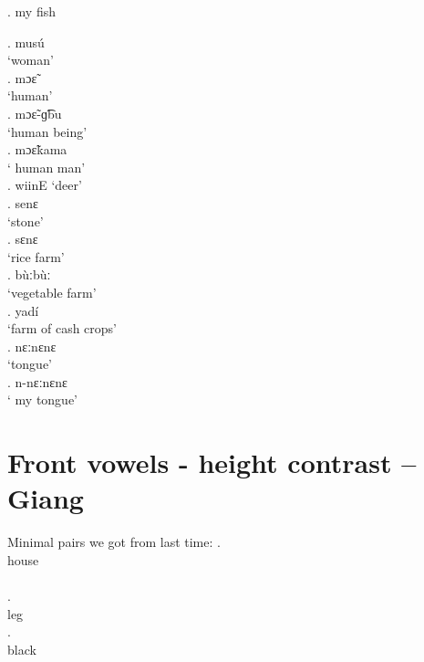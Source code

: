 \documentclass{assets/fieldnotes}
\begin{document}
\ex. my fish

\ex. musú\\
`woman'\\

\ex. mɔɛ̃ \\
`human'\\

\ex.  mɔɛ̃-ɡ͡bu \\
`human being'\\

\ex. mɔɛ̃kama\\
` human man'\\

\ex. wiinE
`deer'\\

\ex. senɛ\\
`stone'\\

\ex. sɛnɛ\\
`rice farm'\\

\ex. bùːbùː\\
`vegetable farm'\\

\ex. yadí\\
`farm of cash crops'\\

\ex. nɛːnɛnɛ\\
`tongue'\\

\exg. n-nɛːnɛnɛ\\
` my tongue'\\


\section{Front vowels - height contrast -- Giang}
Minimal pairs we got from last time:
\ex. \\
house\\
\\

\ex. \\
leg\\

\ex. \\
black\\
\\
\end{document}
